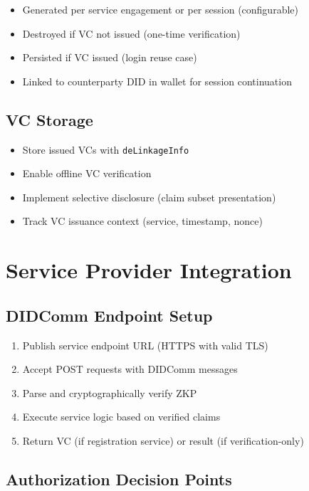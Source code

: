 \begin{itemize}
  \item Generated per service engagement or per session (configurable)
  \item Destroyed if VC not issued (one-time verification)
  \item Persisted if VC issued (login reuse case)
  \item Linked to counterparty DID in wallet for session continuation
\end{itemize}

\subsection{VC Storage}

\begin{itemize}
  \item Store issued VCs with \texttt{deLinkageInfo}
  \item Enable offline VC verification
  \item Implement selective disclosure (claim subset presentation)
  \item Track VC issuance context (service, timestamp, nonce)
\end{itemize}

\section{Service Provider Integration}

\subsection{DIDComm Endpoint Setup}

\begin{enumerate}
  \item Publish service endpoint URL (HTTPS with valid TLS)
  \item Accept POST requests with DIDComm messages
  \item Parse and cryptographically verify ZKP
  \item Execute service logic based on verified claims
  \item Return VC (if registration service) or result (if verification-only)
\end{enumerate}

\subsection{Authorization Decision Points}

